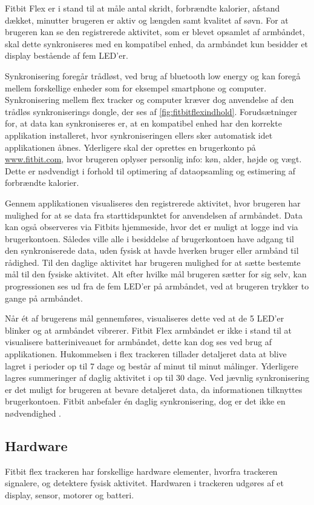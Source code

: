 Fitbit Flex er i stand til at måle antal skridt, forbrændte kalorier, afstand dækket, minutter brugeren er aktiv og længden samt kvalitet af søvn. 
For at brugeren kan se den registrerede aktivitet, som er blevet opsamlet af armbåndet, skal dette synkroniseres med en kompatibel enhed, da armbåndet kun besidder et display bestående af fem LED'er. 

Synkronisering foregår trådløst, ved brug af bluetooth low energy og kan foregå mellem forskellige enheder som for eksempel smartphone og computer. 
Synkronisering mellem flex tracker og computer kræver dog anvendelse af den trådløs synkroniserings dongle, der ses af \autoref{fig:fitbitflexindhold}.
Forudsætninger for, at data kan synkroniseres er, at en kompatibel enhed har den korrekte applikation installeret, hvor synkroniseringen ellers sker automatisk idet applikationen åbnes.  
Yderligere skal der oprettes en brugerkonto på \url{www.fitbit.com}, hvor brugeren oplyser personlig info: køn, alder, højde og vægt. Dette er nødvendigt i forhold til optimering af dataopsamling og estimering af forbrændte kalorier.  

Gennem applikationen visualiseres den registrerede aktivitet, hvor brugeren har mulighed for at se data fra starttidspunktet for anvendelsen af armbåndet. Data kan også observeres via  Fitbits hjemmeside, hvor det er muligt at logge ind via brugerkontoen. 
Således ville alle i besiddelse af brugerkontoen have adgang til den synkroniserede data, uden fysisk at havde hverken bruger eller armbånd til rådighed. 
Til den daglige aktivitet har brugeren mulighed for at sætte bestemte mål til den fysiske aktivitet. Alt efter hvilke mål brugeren sætter for sig selv, kan progressionen ses ud fra de fem LED'er på armbåndet, ved at brugeren trykker to gange på armbåndet.   

Når ét af brugerens mål gennemføres, visualiseres dette ved at de 5 LED'er blinker og at armbåndet vibrerer. 
Fitbit Flex armbåndet er ikke i stand til at visualisere batteriniveauet for armbåndet, dette kan dog ses ved brug af applikationen. 
Hukommelsen i flex trackeren tillader detaljeret data at blive lagret i perioder op til 7 dage og består af minut til minut målinger.  
Yderligere lagres summeringer af daglig aktivitet i op til 30 dage. 
Ved jævnlig synkronisering er det muligt for brugeren at bevare detaljeret data, da informationen tilknyttes brugerkontoen. 
Fitbit anbefaler én daglig synkronisering, dog er det ikke en nødvendighed \citep{fitbitflex}. 

\subsection{Hardware}
Fitbit flex trackeren har forskellige hardware elementer, hvorfra trackeren signalere, og detektere fysisk aktivitet. Hardwaren i trackeren udgøres af et display, sensor, motorer og batteri.
 
